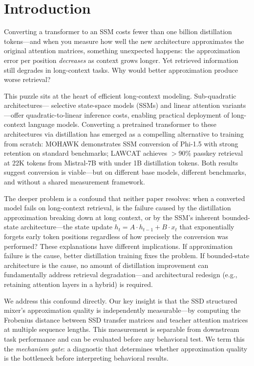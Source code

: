 \section{Introduction}

Converting a transformer to an SSM costs fewer than one billion distillation tokens---and when you
measure how well the new architecture approximates the original attention matrices, something
unexpected happens: the approximation error per position \emph{decreases} as context grows longer.
Yet retrieved information still degrades in long-context tasks. Why would better approximation
produce worse retrieval?

This puzzle sits at the heart of efficient long-context modeling. Sub-quadratic architectures---
selective state-space models (SSMs) and linear attention variants---offer quadratic-to-linear
inference costs, enabling practical deployment of long-context language models. Converting a
pretrained transformer to these architectures via distillation has emerged as a compelling
alternative to training from scratch: MOHAWK \citep{Bick2024MOHAWK} demonstrates SSM conversion of
Phi-1.5 with strong retention on standard benchmarks; LAWCAT \citep{Liu2025LAWCAT} achieves
$>$90\% passkey retrieval at 22K tokens from Mistral-7B with under 1B distillation tokens. Both
results suggest conversion is viable---but on different base models, different benchmarks, and
without a shared measurement framework.

The deeper problem is a confound that neither paper resolves: when a converted model fails on
long-context retrieval, is the failure caused by the distillation approximation breaking down
at long context, or by the SSM's inherent bounded-state architecture---the state update
$h_t = A \cdot h_{t-1} + B \cdot x_t$ that exponentially forgets early token positions regardless
of how precisely the conversion was performed? These explanations have different implications.
If approximation failure is the cause, better distillation training fixes the problem. If
bounded-state architecture is the cause, no amount of distillation improvement can fundamentally
address retrieval degradation---and architectural redesign (e.g., retaining attention layers in
a hybrid) is required.

We address this confound directly. Our key insight is that the SSD structured mixer's approximation
quality is independently measurable---by computing the Frobenius distance between SSD transfer
matrices and teacher attention matrices at multiple sequence lengths. This measurement is separable
from downstream task performance and can be evaluated before any behavioral test. We term this
the \emph{mechanism gate}: a diagnostic that determines whether approximation quality is the
bottleneck before interpreting behavioral results.

